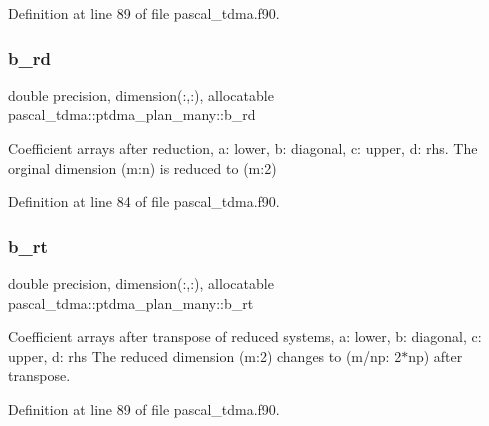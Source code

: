 Definition at line 89 of file pascal\+\_\+tdma.\+f90.

\mbox{\label{structpascal__tdma_1_1ptdma__plan__many_a81ed1b6910c30334e93598f7d18254a3}} 
\subsubsection{\texorpdfstring{b\_rd}{b\_rd}}
{\footnotesize\ttfamily double precision, dimension(\+:,\+:), allocatable pascal\+\_\+tdma\+::ptdma\+\_\+plan\+\_\+many\+::b\+\_\+rd}



Coefficient arrays after reduction, a\+: lower, b\+: diagonal, c\+: upper, d\+: rhs. The orginal dimension (m\+:n) is reduced to (m\+:2) 



Definition at line 84 of file pascal\+\_\+tdma.\+f90.

\mbox{\label{structpascal__tdma_1_1ptdma__plan__many_aab84eff7c823d47acb5388cd4e2a790a}} 
\subsubsection{\texorpdfstring{b\_rt}{b\_rt}}
{\footnotesize\ttfamily double precision, dimension(\+:,\+:), allocatable pascal\+\_\+tdma\+::ptdma\+\_\+plan\+\_\+many\+::b\+\_\+rt}



Coefficient arrays after transpose of reduced systems, a\+: lower, b\+: diagonal, c\+: upper, d\+: rhs The reduced dimension (m\+:2) changes to (m/np\+: 2$\ast$np) after transpose. 



Definition at line 89 of file pascal\+\_\+tdma.\+f90.

\mbox{\label{structpascal__tdma_1_1ptdma__plan__many_a56b15fe2b742c06106a46da7a720d9fd}} 
